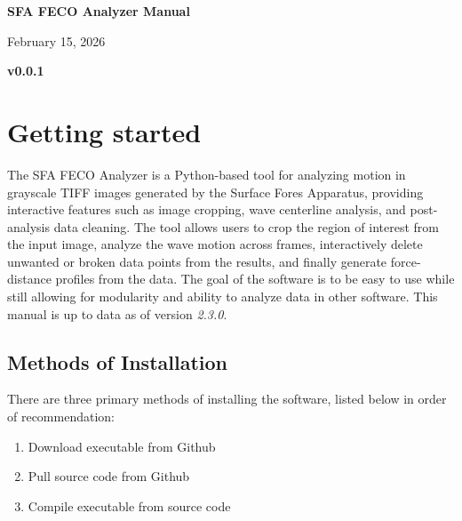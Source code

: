 \documentclass[12pt]{extarticle}
\begin{document}
\begin{titlepage}
    \begin{center}
        \vspace*{1cm}
            
        \Huge
        \textbf{SFA FECO Analyzer Manual}
            
        \vspace{0.5cm}
        \LARGE
        February 15, 2026
            
        \vspace{1.5cm}
            
        \textbf{v0.0.1}
            
            
    \end{center}
\end{titlepage}	

\tableofcontents

\newpage

\section{Getting started}

	The SFA FECO Analyzer is a Python-based tool for analyzing motion in grayscale TIFF images generated by the Surface Fores Apparatus, providing interactive features such as image cropping, wave centerline analysis, and post-analysis data cleaning. The tool allows users to crop the region of interest from the input image, analyze the wave motion across frames, interactively delete unwanted or broken data points from the results, and finally generate force-distance profiles from the data.
	The goal of the software is to be easy to use while still allowing for modularity and ability to analyze data in other software. This manual is up to data as of version \textit{2.3.0}.

	\subsection{Methods of Installation}

		There are three primary methods of installing the software, listed below in order of recommendation:

		\begin{enumerate}
			\item Download executable from Github
			\item Pull source code from Github
			\item Compile executable from source code
		\end{enumerate}
\end{document}
